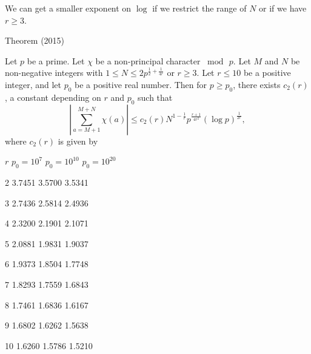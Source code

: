  We can get  a smaller exponent on $\log$ if we restrict the range of
 $N$ or if we have $r\ge 3$.
\par 
\begin{thm}{Theorem (2015)}

Let $p$ be a prime. Let $\chi$ be a non-principal character
$\bmod{\,p}$. Let $M$ and $N$ be non-negative integers with $1\le N\le
2 p^{\frac{1}{2} + \frac{1}{4r}}$ or $r\ge 3$. Let $r\le 10$ be a
positive integer, and let $p_0$ be a positive real number. Then for $p
\ge p_0$, there exists $c_2(r)$, a constant depending on $r$ and $p_0$
such that 
$$
\left|\sum_{a=M+1}^{M+N}\chi(a)\right|
\le
 c_2(r) N^{1-\frac{1}{r}} p^{\frac{r+1}{4r^2}}(\log{p})^{\frac{1}{2r}},
$$
where $c_2(r)$ is given by
  
  
  
    
      $r$
      $p_0=10^7$
      $p_0=10^{10}$
      $p_0=10^{20}$
    
  
  
    2
    3.7451
    3.5700
    3.5341
  
  
    3
    2.7436
    2.5814
    2.4936
  
  
    4
    2.3200
    2.1901
    2.1071
  
  
    5
    2.0881
    1.9831
    1.9037
  
  
    6
    1.9373
    1.8504
    1.7748
  
  
    7
    1.8293
    1.7559
    1.6843
  
  
    8
    1.7461
    1.6836
    1.6167
  
  
    9
    1.6802
    1.6262
    1.5638
  
  
    10
    1.6260
    1.5786
    1.5210
  
 

\end{thm}

\par 

